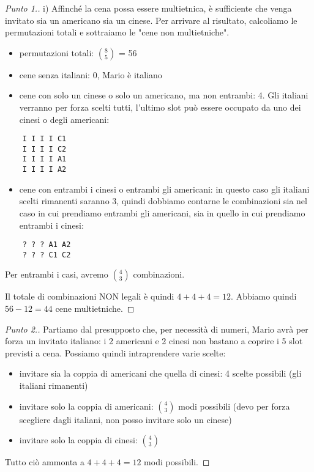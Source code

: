 \documentclass[12pt]{article}
\renewcommand\qedsymbol{$\square$}
\begin{document}
\renewcommand\qedsymbol{$\square$}

\begin{proof}[Punto 1.]
	i) Affinché la cena possa essere multietnica, è sufficiente che venga invitato sia un americano sia un cinese. Per arrivare al risultato, calcoliamo le permutazioni totali e sottraiamo le "cene non multietniche".
	
	\begin{itemize}
		\item permutazioni totali: $\binom{8}{5}$ = 56
		\item cene senza italiani: 0, Mario è italiano
		\item cene con solo un cinese o solo un americano, ma non entrambi: 4. Gli italiani verranno per forza scelti tutti, l'ultimo slot può essere occupato da uno dei cinesi o degli americani:
	\end{itemize}
	
	\begin{verbatim}
    I I I I C1
    I I I I C2
    I I I I A1
    I I I I A2
	\end{verbatim}
	
	\begin{itemize}
		\item cene con entrambi i cinesi o entrambi gli americani: in questo caso gli italiani scelti rimanenti saranno 3, quindi dobbiamo contarne le combinazioni sia nel caso in cui prendiamo entrambi gli americani, sia in quello in cui prendiamo entrambi i cinesi:
	\end{itemize}
	
	\begin{verbatim}
    ? ? ? A1 A2
    ? ? ? C1 C2
	\end{verbatim}
	
	Per entrambi i casi, avremo $\binom{4}{3}$ combinazioni.
	
	Il totale di combinazioni NON legali è quindi $4 + 4 + 4 = 12$. Abbiamo quindi $56 - 12 = 44$ cene multietniche.
\end{proof}

\renewcommand\qedsymbol{$\blacksquare$}

\begin{proof}[Punto 2.]
	Partiamo dal presupposto che, per necessità di numeri, Mario avrà per forza un invitato italiano: i 2 americani e 2 cinesi non bastano a coprire i 5 slot previsti a cena. Possiamo quindi intraprendere varie scelte:
	
	\begin{itemize}
		\item invitare sia la coppia di americani che quella di cinesi: 4 scelte possibili (gli italiani rimanenti)
		\item invitare solo la coppia di americani: $\binom{4}{3}$ modi possibili (devo per forza scegliere dagli italiani, non posso invitare solo un cinese)
		\item invitare solo la coppia di cinesi: $\binom{4}{3}$
	\end{itemize}
	
	Tutto ciò ammonta a $4 + 4 + 4 = 12$  modi possibili.
	
\end{proof}
\end{document}
